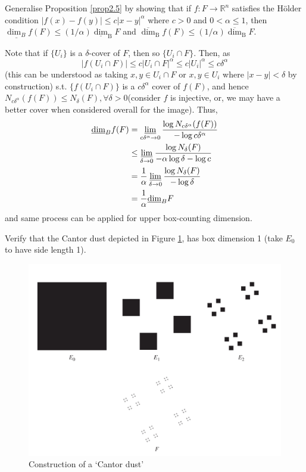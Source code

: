 \documentclass[12pt, a4paper]{article}
\begin{document}
\begin{customexercise}{2.2}
    Generalise Proposition \ref{prop2.5} by showing that if $f: F \rightarrow \mathbb{R}^{n}$ satisfies the Hölder condition $|f(x)-f(y)| \leq c|x-y|^{\alpha}$ where $c>0$ and $0<\alpha \leq 1$, then $\underline{\operatorname{dim}_{B}} f(F) \leq(1 / \alpha) \underline{\operatorname{dim}}_{\mathrm{B}} F$ and $\overline{\operatorname{dim}}_{\mathrm{B}} f(F) \leq(1 / \alpha) \overline{\operatorname{dim}}_{\mathrm{B}} F$.
\end{customexercise}

\begin{customsol}{2.2}
    Note that if $\{U_i\}$ is a $\delta$-cover of $F$, then so $\{U_i\cap F\}$. Then, as
    $$
    |f(U_i\cap F)|\leq c|U_i\cap F|^\alpha\leq c|U_i|^\alpha\leq c\delta^\alpha
    $$
    (this can be understood as taking $x, y\in U_i\cap F$ or $x, y\in U_i$ where $|x-y|<\delta$ by construction)
    s.t. $\{f(U_i\cap F)\}$ is a $c\delta^\alpha$ cover of $f(F)$, and hence $N_{c\delta^\alpha}(f(F)) \leq N_\delta(F), \forall \delta>0$(consider $f$ is injective, or, we may have a better cover when considered overall for the image). Thus,
    $$
    \begin{aligned} \underline{\operatorname{dim}}_{B} f(F) &=\varliminf_{c \delta^{\alpha} \rightarrow 0} \frac{\log N_{c \delta^{\alpha}}(f(F))}{-\log c \delta^{\alpha}} \\
        &\leq \varliminf_{\delta \rightarrow 0} \frac{\log N_{\delta}(F)}{-\alpha \log \delta-\log c} \\ &=\frac{1}{\alpha} \varliminf_{\delta \rightarrow 0} \frac{\log N_{\delta}(F)}{-\log \delta}\\
        &=\frac{1}{\alpha} \underline{\operatorname{dim}}_{B} F \end{aligned}
    $$
    and same process can be applied for upper box-counting dimension. 
\end{customsol}


\begin{customexercise}{2.4}\label{calculation}
    Verify that the Cantor dust depicted in Figure \ref{fig:cantordust}, has box dimension 1 (take $E_{0}$ to have side length 1).
    \begin{figure}[H]
        \centering
        \includegraphics[width=.66\textwidth]{images/cantordust.png}
        \caption{ Construction of a ‘Cantor dust’ }
        \label{fig:cantordust}
    \end{figure}
\end{customexercise}
\end{document}
